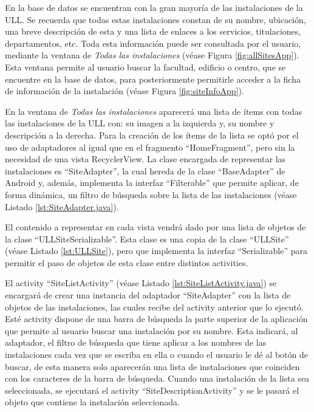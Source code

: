 En la base de datos se encuentran con la gran mayoría de las instalaciones de la ULL. Se recuerda que todas estas instalaciones constan de su nombre, ubicación, una breve descripción de esta y una lista de enlaces a los servicios, titulaciones, departamentos, etc. Toda esta información puede ser consultada por el usuario, mediante la ventana de \textit{Todas las instalaciones} (véase Figura \ref{fig:allSitesApp}). Esta ventana permite al usuario buscar la facultad, edificio o centro, que se encuentre en la base de datos, para posteriormente permitirle acceder a la ficha de información de la instalación (véase Figura \ref{fig:siteInfoApp}). 

En la ventana de \textit{Todas las instalaciones}  aparecerá una lista de ítems con todas las instalaciones  de la ULL con: su imagen a la izquierda y, su nombre y descripción a la derecha. Para la creación de los ítems de la lista se optó por el uso de adaptadores al igual que en el fragmento ``HomeFragment'', pero sin la necesidad de una vista RecyclerView. La clase encargada de representar las instalaciones es ``SiteAdapter'', la cual hereda de la clase ``BaseAdapter'' de Android y, además, implementa la interfaz ``Filterable'' que permite aplicar, de forma dinámica, un filtro de búsqueda sobre la lista de las instalaciones (véase Listado \ref{lst:SiteAdapter.java}). 



El contenido a representar en cada vista vendrá dado por una lista de objetos de la clase ``ULLSiteSerializable''. Esta clase es una copia de la clase ``ULLSite'' (véase Listado \ref{lst:ULLSite}), pero que implementa la interfaz ``Serializable'' para permitir el paso de objetos de esta clase entre distintos activities. 



El activity ``SiteListActivity'' (véase Listado \ref{lst:SiteListActivity.java}) se encargará de crear una instancia del adaptador ``SiteAdapter'' con la lista de objetos de las instalaciones, las cuales recibe del activity anterior que lo ejecutó. Esté activity dispone de una barra de búsqueda la parte superior de la aplicación que permite al usuario buscar una instalación por su nombre. Esta indicará, al adaptador, el filtro de búsqueda que tiene aplicar a los nombres de las instalaciones cada vez que se escriba en ella o cuando el usuario le dé al botón de buscar, de esta manera solo aparecerán una lista de instalaciones que coinciden con los caracteres de la barra de búsqueda. Cuando una instalación de la lista sea seleccionada, se ejecutará el activity ``SiteDescriptionActivity'' y se le pasará el objeto que contiene la instalación seleccionada.

